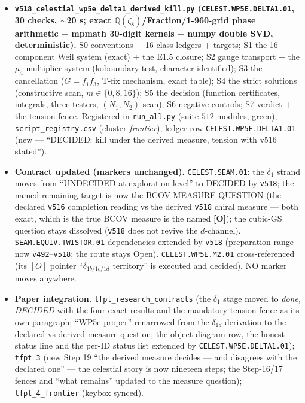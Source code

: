 \documentclass[11pt]{article}
\providecommand{\mO}{\textbf{[O]}}\providecommand{\mX}{\textbf{[X]}}
\providecommand{\Q}{\mathbb{Q}}
\begin{document}
\begin{itemize}[leftmargin=1.5em]
\item \textbf{\texttt{v518\_celestial\_wp5e\_delta1\_derived\_kill.py} (\texttt{CELEST.WP5E.DELTA1.01},
30 checks, $\sim$20 s; exact $\Q(\zeta_8)$/Fraction/1-960-grid phase arithmetic $+$ mpmath
30-digit kernels $+$ numpy double SVD, deterministic).} S0 conventions $+$ 16-class ledgers $+$
targets; S1 the 16-component Weil system (exact) $+$ the E1.5 closure; S2 gauge transport $+$
the $\mu_4$ multiplier system (koboundary test, character identified); S3 the cancellation
($G=f_1f_3$, T-fix mechanism, exact table); S4 the strict solutions (constructive scan,
$m\in\{0,8,16\}$); S5 the decision (function certificates, integrals, three testers, $(N_1,N_2)$
scan); S6 negative controls; S7 verdict $+$ the tension fence. Registered in
\texttt{run\_all.py} (suite $512$ modules, green), \texttt{script\_registry.csv} (cluster
\emph{frontier}), ledger row \texttt{CELEST.WP5E.DELTA1.01} (new --- ``DECIDED: kill under the
derived measure, tension with v516 stated'').
\item \textbf{Contract updated (markers unchanged).} \texttt{CELEST.SEAM.01}: the $\delta_1$
strand moves from ``UNDECIDED at exploration level'' to DECIDED by \texttt{v518}; the named
remaining target is now the BCOV MEASURE QUESTION (the declared \texttt{v516} completion
reading vs the derived \texttt{v518} chiral measure --- both exact, which is the true BCOV
measure is the named \mO); the cubic-GS question stays dissolved (\texttt{v518} does not revive
the $d$-channel). \texttt{SEAM.EQUIV.TWISTOR.01} dependencies extended by \texttt{v518}
(preparation range now \texttt{v492}--\texttt{v518}; the route stays Open).
\texttt{CELEST.WP5E.M2.01} cross-referenced (its $[O]$ pointer ``$\delta_{1b/1c/1d}$
territory'' is executed and decided). NO marker moves anywhere.
\item \textbf{Paper integration.} \texttt{tfpt\_research\_contracts} (the $\delta_1$ stage moved
to \emph{done, DECIDED} with the four exact results and the mandatory tension fence as its own
paragraph; ``WP5e proper'' renarrowed from the $\delta_{1d}$ derivation to the
declared-vs-derived measure question; the object-diagram row, the honest status line and the
per-ID status list extended by \texttt{CELEST.WP5E.DELTA1.01}); \texttt{tfpt\_3} (new Step 19
``the derived measure decides --- and disagrees with the declared one'' --- the celestial story
is now nineteen steps; the Step-16/17 fences and ``what remains'' updated to the measure
question); \texttt{tfpt\_4\_frontier} (keybox synced).

\end{itemize}
\end{document}

